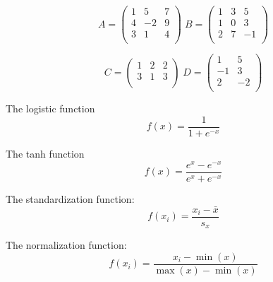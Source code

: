 \documentclass{beamer}
\begin{document}
\begin{frame}
	\huge
\[
	A= \left(\begin{matrix}
	1 & 5 & 7 \\
	4 & -2 & 9\\
	3 & 1 & 4\\
	\end{matrix}\right)\;
			B = \left(\begin{matrix}
		1 & 3 & 5 \\
		1 & 0 & 3\\
		2 & 7 & -1\\
		\end{matrix}\right)
\]
\end{frame}
\begin{frame}
	\huge
	\[
	C= \left(\begin{matrix}
	1 & 2 & 2 \\
	3 & 1 & 3\\
	\end{matrix}\right)\;
	D = \left(\begin{matrix}
	1 & 5  \\
	-1 & 3\\
	2  & -2\\
	\end{matrix}\right)
	\]
\end{frame}
\begin{frame}
	\huge
The logistic function
	\[
f(x) = \frac{1}{1+e^{-x}}
	\]
\end{frame}
\begin{frame}
	\huge
	The tanh function
	\[
	f(x) = \frac{e^{x}-e^{-x}}{e^{x}+e^{-x}}
	\]
\end{frame}
\begin{frame}
	\huge
	The standardization function: \smallskip
	\[
	f(x_i) = \frac{x_i-\bar{x}}{s_x}
	\]
	
\end{frame}
\begin{frame}
	\huge
	The normalization function: \smallskip
	\[
	f(x_i) = \frac{x_i-\operatorname{min}(x)}{\operatorname{max}(x)-\operatorname{min}(x)}
	\]
	
\end{frame}
\end{document}
